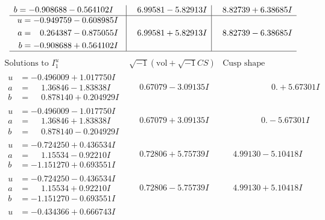 \documentclass[1p]{elsarticle_modified}
\theoremstyle{definition}
\newcommand{\I}{\sqrt{-1}}
\begin{document}
$$\begin{array}{c|c|c}
\begin{aligned}
b &= -0.908688 - 0.564102 I\end{aligned}
 & \phantom{-}6.99581 - 5.82913 I & \phantom{-}8.82739 + 6.38685 I \\ \hline\begin{aligned}
u &= -0.949759 - 0.608985 I \\
a &= \phantom{-}0.264387 - 0.875055 I \\
b &= -0.908688 + 0.564102 I\end{aligned}
 & \phantom{-}6.99581 + 5.82913 I & \phantom{-}8.82739 - 6.38685 I\\
 \hline 
 \end{array}$$\newpage$$\begin{array}{c|c|c}  
\text{Solutions to }I^u_{1}& \I (\text{vol} + \sqrt{-1}CS) & \text{Cusp shape}\\
 \hline 
\begin{aligned}
u &= -0.496009 + 1.017750 I \\
a &= \phantom{-}1.36846 - 1.83838 I \\
b &= \phantom{-}0.878140 + 0.204929 I\end{aligned}
 & \phantom{-}0.67079 - 3.09135 I & \phantom{-0.000000 -}0. + 5.67301 I \\ \hline\begin{aligned}
u &= -0.496009 - 1.017750 I \\
a &= \phantom{-}1.36846 + 1.83838 I \\
b &= \phantom{-}0.878140 - 0.204929 I\end{aligned}
 & \phantom{-}0.67079 + 3.09135 I & \phantom{-0.000000 } 0. - 5.67301 I \\ \hline\begin{aligned}
u &= -0.724250 + 0.436534 I \\
a &= \phantom{-}1.15534 - 0.92210 I \\
b &= -1.151270 + 0.693551 I\end{aligned}
 & \phantom{-}0.72806 + 5.75739 I & \phantom{-}4.99130 - 5.10418 I \\ \hline\begin{aligned}
u &= -0.724250 - 0.436534 I \\
a &= \phantom{-}1.15534 + 0.92210 I \\
b &= -1.151270 - 0.693551 I\end{aligned}
 & \phantom{-}0.72806 - 5.75739 I & \phantom{-}4.99130 + 5.10418 I \\ \hline\begin{aligned}
u &= -0.434366 + 0.666743 I \\

\end{aligned}
\end{array}$$
\end{document}
